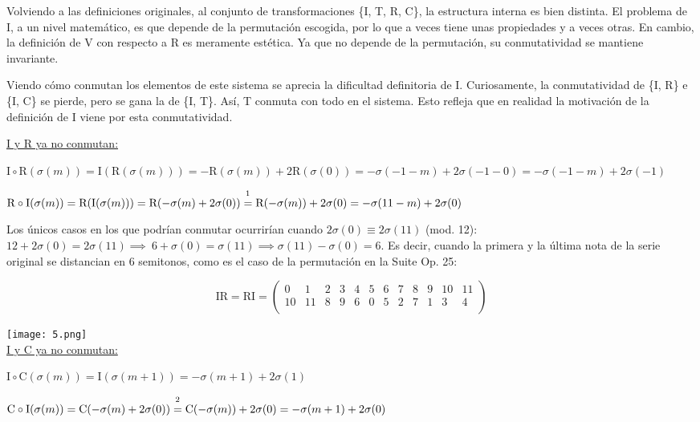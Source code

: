 		Volviendo a las definiciones originales, al conjunto de transformaciones \{I, T, R, C\}, la estructura interna es bien distinta. El problema de I, a un nivel matemático, es que depende de la permutación escogida, por lo que a veces tiene unas propiedades y a veces otras. En cambio, la definición de V con respecto a R es meramente estética. Ya que no depende de la permutación, su conmutatividad se mantiene invariante. 
		
		Viendo cómo conmutan los elementos de este sistema se aprecia la dificultad definitoria de I. Curiosamente, la conmutatividad de \{I, R\} e \{I, C\} se pierde, pero se gana la de \{I, T\}. Así, T conmuta con todo en el sistema. Esto refleja que en realidad la motivación de la definición de I viene por esta conmutatividad.
		
		\underline{I y R ya no conmutan:}
		
		$\text{I}\circ\text{R}(\sigma(m))=\text{I}(\text{R}(\sigma(m)))=-\text{R}(\sigma(m))+2\text{R}(\sigma(0))=-\sigma(-1-m)+2\sigma(-1-0)=-\sigma(-1-m)+2\sigma(-1)$
		
		$\text{R}\circ\text{I}(\sigma(m))=\text{R}(\text{I}(\sigma(m)))=\text{R}(-\sigma(m)+2\sigma(0))\overset{\footnote{R y T conmutan}}{=}\text{R}(-\sigma(m))+2\sigma(0)=-\sigma(11-m)+2\sigma(0)$
		
		Los únicos casos en los que podrían conmutar ocurrirían cuando $2\sigma\left(0\right)\equiv2\sigma(11)$ (mod. 12): $12+2\sigma\left(0\right)=2\sigma\left(11\right)\implies\ 6+\sigma\left(0\right)=\sigma\left(11\right)\implies \sigma\left(11\right)-\sigma\left(0\right)=6$. Es decir, cuando la primera y la última nota de la serie original se distancian en 6 semitonos, como es el caso de la permutación en la Suite Op. 25:
		
		$$
		\text{IR}=\text{RI}=\left(\begin{matrix}0&1&2&3&4&5&6&7&8&9&10&11\\10&11&8&9&6&0&5&2&7&1&3&4\\\end{matrix}\right)
		$$	
		
		\texttt{[image: 5.png]}\\
		
		\underline{I y C ya no conmutan:}
		
		$\text{I}\circ\text{C}(\sigma(m))=\text{I}(\sigma(m+1))=-\sigma(m+1)+2\sigma(1)$
		
		$\text{C}\circ\text{I}(\sigma(m))=\text{C}(-\sigma(m)+2\sigma(0))\overset{\footnote{C y T conmutan}}{=}\text{C}(-\sigma(m))+2\sigma(0)=-\sigma(m+1)+2\sigma(0)$
		
